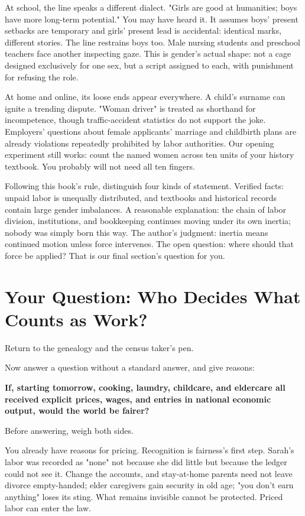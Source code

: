 At school, the line speaks a different dialect. "Girls are good at humanities; boys have more long-term potential." You may have heard it. It assumes boys' present setbacks are temporary and girls' present lead is accidental: identical marks, different stories. The line restrains boys too. Male nursing students and preschool teachers face another inspecting gaze. This is gender's actual shape: not a cage designed exclusively for one sex, but a script assigned to each, with punishment for refusing the role.

At home and online, its loose ends appear everywhere. A child's surname can ignite a trending dispute. "Woman driver" is treated as shorthand for incompetence, though traffic-accident statistics do not support the joke. Employers' questions about female applicants' marriage and childbirth plans are already violations repeatedly prohibited by labor authorities. Our opening experiment still works: count the named women across ten units of your history textbook. You probably will not need all ten fingers.

Following this book's rule, distinguish four kinds of statement. Verified facts: unpaid labor is unequally distributed, and textbooks and historical records contain large gender imbalances. A reasonable explanation: the chain of labor division, institutions, and bookkeeping continues moving under its own inertia; nobody was simply born this way. The author's judgment: inertia means continued motion unless force intervenes. The open question: where should that force be applied? That is our final section's question for you.

\section[Who Decides What Counts as Work?]{Your Question: Who Decides What Counts as Work?}
Return to the genealogy and the census taker's pen.

Now answer a question without a standard answer, and give reasons:

\textbf{If, starting tomorrow, cooking, laundry, childcare, and eldercare all received explicit prices, wages, and entries in national economic output, would the world be fairer?}

Before answering, weigh both sides.

You already have reasons for pricing. Recognition is fairness's first step. Sarah's labor was recorded as "none" not because she did little but because the ledger could not see it. Change the accounts, and stay-at-home parents need not leave divorce empty-handed; elder caregivers gain security in old age; "you don't earn anything" loses its sting. What remains invisible cannot be protected. Priced labor can enter the law.

